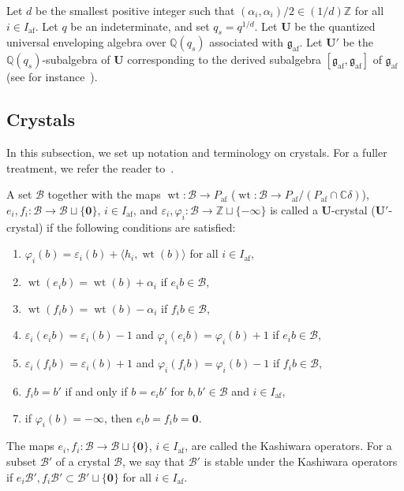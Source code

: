 \documentclass[ALCO,ThmDefs,Unicode,epreuves]{cedram}
\newcommand{\Fg}{\mathfrak{g}}
\newcommand{\BC}{\mathbb{C}}
\newcommand{\BQ}{\mathbb{Q}}
\newcommand{\BZ}{\mathbb{Z}}
\newcommand\bm[1]{\boldsymbol{#1}}
\renewcommand{\U}{\mathbf{U}}
\DeclareMathOperator{\af}{af}
\DeclareMathOperator{\wt}{wt}
\begin{document}
Let $d$ be the smallest positive integer such that
$(\alpha_i , \alpha_i) / 2 \in (1/d)\BZ$ 
for all $i \in I_{\af}$. 
Let $q$ be an indeterminate, and set
$q_s = q^{1/d}$. 
Let 
$\U$
be the quantized universal enveloping algebra over $\BQ(q_s)$
associated with $\Fg_{\af}$. 
Let 
$\U'$
be the $\BQ(q_s)$-subalgebra of $\U$ 
corresponding to the derived subalgebra
$[\Fg_{\af},\Fg_{\af}]$ of $\Fg_{\af}$
(see for instance~\cite[\S~2.2]{BN04}). 

\subsection{Crystals} \label{Subsection:Crystals}

In this subsection, 
we set up notation and terminology on crystals. 
For a fuller treatment, we refer the reader to~\cite{AK,K94,K95,K02}. 

A set
$\mathcal{B}$
together with the maps
$\wt : \mathcal{B} \rightarrow P_{\af}$
(\resp $\wt : \mathcal{B} \rightarrow P_{\af} / (P_{\af} \cap \BC \delta)$), 
$e_i , f_i : \mathcal{B} \rightarrow \mathcal{B} \sqcup \{ \bm{0} \}$, $i \in I_{\af}$, 
and 
$\varepsilon_i , \varphi_i : \mathcal{B} \rightarrow \BZ \sqcup \{ -\infty \}$
is called a $\U$-crystal (\resp $\U'$-crystal) if the following conditions are satisfied:
\begin{enumerate}[label=(C\arabic*)]
\item
$\varphi_i(b) = \varepsilon_i(b) + \langle h_i , \wt (b) \rangle$ 
for all 
$i \in I_{\af}$, 
\item
$\wt (e_i b) = \wt (b) + \alpha_i$ 
if 
$e_i b \in \mathcal{B}$, 
\item
$\wt (f_i b) = \wt (b) - \alpha_i$ 
if 
$f_i b \in \mathcal{B}$, 
\item
$\varepsilon_i (e_i b) = \varepsilon_i(b) - 1$
and 
$\varphi_i (e_i b) = \varphi_i(b) + 1$
if 
$e_i b \in \mathcal{B}$, 
\item
$\varepsilon_i (f_i b) = \varepsilon_i(b) + 1$
and 
$\varphi_i (f_i b) = \varphi_i(b) - 1$
if 
$f_i b \in \mathcal{B}$, 
\item
$f_i b = b'$
if and only if 
$b = e_i b'$
for 
$b,b' \in \mathcal{B}$ 
and 
$i \in I_{\af}$, 
\item
if 
$\varphi_i(b) = -\infty$, 
then
$e_i b = f_i b = \bm{0}$.
\end{enumerate}
The maps 
$e_i , f_i : \mathcal{B} \rightarrow \mathcal{B} \sqcup \{ \bm{0} \}$, $i \in I_{\af}$, 
are called the Kashiwara operators. 
For a subset $\mathcal{B}'$ of a crystal $\mathcal{B}$, 
we say that $\mathcal{B}'$ is stable under the Kashiwara operators if
$e_i \mathcal{B}' , f_i \mathcal{B}' \subset \mathcal{B}' \sqcup \{ \bm{0} \}$
for all 
$i \in I_{\af}$.
\end{document}
